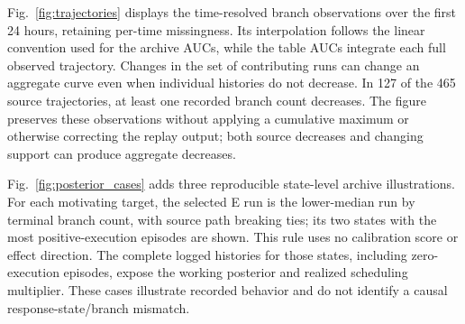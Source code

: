 \documentclass[final,5p,times,number]{elsarticle}
\newcommand{\figref}[1]{Fig.~\ref{#1}}
\begin{document}
\figref{fig:trajectories} displays the time-resolved branch observations over the first 24 hours, retaining per-time missingness. Its interpolation follows the linear convention used for the archive AUCs, while the table AUCs integrate each full observed trajectory. Changes in the set of contributing runs can change an aggregate curve even when individual histories do not decrease. In 127 of the 465 source trajectories, at least one recorded branch count decreases. The figure preserves these observations without applying a cumulative maximum or otherwise correcting the replay output; both source decreases and changing support can produce aggregate decreases.

\figref{fig:posterior_cases} adds three reproducible state-level archive illustrations. For each motivating target, the selected E run is the lower-median run by terminal branch count, with source path breaking ties; its two states with the most positive-execution episodes are shown. This rule uses no calibration score or effect direction. The complete logged histories for those states, including zero-execution episodes, expose the working posterior and realized scheduling multiplier. These cases illustrate recorded behavior and do not identify a causal response-state/branch mismatch.
\end{document}

